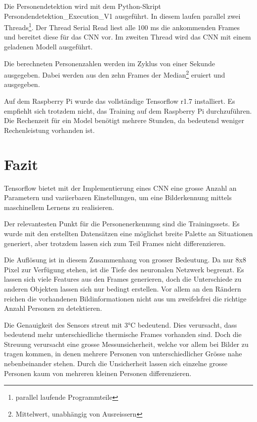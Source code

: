 Die Personendetektion wird mit dem Python-Skript Persondendetektion\_Execution\_V1 ausgeführt. In diesem laufen parallel zwei Threads\footnote{parallel laufende Programmteile}. Der Thread Serial Read liest alle 100 ms die ankommenden Frames und bereitet diese für das \ac{CNN} vor. Im zweiten Thread wird das \ac{CNN} mit einem geladenen Modell ausgeführt. 

Die berechneten Personenzahlen werden im Zyklus von einer Sekunde ausgegeben. Dabei werden aus den zehn Frames der Median\footnote{Mittelwert, unabhängig von Ausreissern} eruiert und ausgegeben. 

Auf dem Raspberry Pi wurde das vollständige Tensorflow r1.7 installiert. Es empfiehlt sich trotzdem nicht, das Training auf dem Raspberry Pi durchzuführen. Die Rechenzeit für ein Model benötigt mehrere Stunden, da bedeutend weniger Rechenleistung vorhanden ist. 


\section{Fazit}

Tensorflow bietet mit der Implementierung eines \ac{CNN} eine grosse Anzahl an Parametern und variierbaren Einstellungen, um eine Bilderkennung mittels maschinellem Lernens zu realisieren. 

Der relevantesten Punkt für die Personenerkennung sind die Trainingssets. Es wurde mit den erstellten Datensätzen eine möglichst breite Palette an Situationen generiert, aber trotzdem lassen sich zum Teil Frames nicht differenzieren.

Die Auflösung ist in diesem Zusammenhang von grosser Bedeutung. Da nur 8x8 Pixel zur Verfügung stehen, ist die Tiefe des neuronalen Netzwerk begrenzt. Es lassen sich viele Features aus den Frames generieren, doch die Unterschiede zu anderen Objekten lassen sich nur bedingt erstellen. Vor allem an den Rändern reichen die vorhandenen Bildinformationen nicht aus um zweifelsfrei die richtige Anzahl Personen zu detektieren. 

Die Genauigkeit des Sensors streut mit 3°C bedeutend. Dies verursacht, dass bedeutend mehr unterschiedliche thermische Frames vorhanden sind. Doch die Streuung verursacht eine grosse Messunsicherheit, welche vor allem bei Bilder zu tragen kommen, in denen mehrere Personen von unterschiedlicher Grösse nahe nebenbeinander stehen. Durch die Unsicherheit lassen sich einzelne grosse Personen kaum von mehreren kleinen Personen differenzieren.






